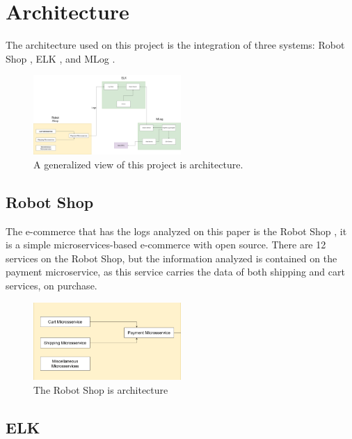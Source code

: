 \section{Architecture}

The architecture used on this project is the integration of three systems: Robot Shop \cite{robotshop}, ELK \cite{elk}, and MLog \cite{mlog}.

\begin{figure}[htbp]
\centering
\centerline{\includegraphics[width=0.5\textwidth]{Media/architecture.png}}
\caption{A generalized view of this project is architecture.}
\label{fig:architecture}
\end{figure}

\subsection{Robot Shop}

The e-commerce that has the logs analyzed on this paper is the Robot Shop \cite{robotshop}, it is a simple microservices-based e-commerce with open source. There are 12 services on the Robot Shop, but the information analyzed is contained on the payment microservice, as this service carries the data of both shipping and cart services, on purchase.

\begin{figure}[htbp]
\centering
\centerline{\includegraphics[width=0.5\textwidth]{Media/robot_shop.png}}
\caption{The Robot Shop is architecture}
\label{fig:architecture-robot-shop}
\end{figure}

\subsection{ELK}

